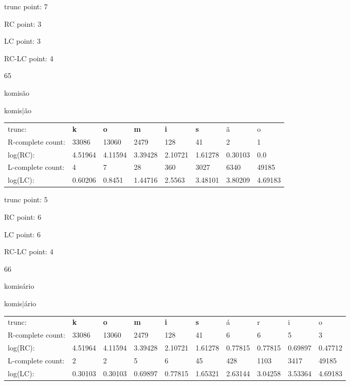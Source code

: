 \documentclass{article}
\begin{document}
trunc point: 7

RC point: 3

LC point: 3

RC-LC point: 4

\vspace{3em}



65

komisão

komis$|$ão

\vspace{1em}

\begin{tabular}{l|lllllll}

trunc: & {\color{red}\bf k} & {\color{red}\bf o} & {\color{red}\bf m} & {\color{red}\bf i} & {\color{red}\bf s} & ã & o \\ 
R-complete count: & 33086 & 13060 & 2479 & 128 & 41 & 2 & 1 \\ 
log(RC): & 4.51964 & 4.11594 & 3.39428 & 2.10721 & 1.61278 & 0.30103 & 0.0 \\ 
L-complete count: & 4 & 7 & 28 & 360 & 3027 & 6340 & 49185 \\ 
log(LC): & 0.60206 & 0.8451 & 1.44716 & 2.5563 & 3.48101 & 3.80209 & 4.69183 \\ 
\end{tabular}

trunc point: 5

RC point: 6

LC point: 6

RC-LC point: 4

\vspace{3em}



66

komisário

komis$|$ário

\vspace{1em}

\begin{tabular}{l|lllllllll}

trunc: & {\color{red}\bf k} & {\color{red}\bf o} & {\color{red}\bf m} & {\color{red}\bf i} & {\color{red}\bf s} & á & r & i & o \\ 
R-complete count: & 33086 & 13060 & 2479 & 128 & 41 & 6 & 6 & 5 & 3 \\ 
log(RC): & 4.51964 & 4.11594 & 3.39428 & 2.10721 & 1.61278 & 0.77815 & 0.77815 & 0.69897 & 0.47712 \\ 
L-complete count: & 2 & 2 & 5 & 6 & 45 & 428 & 1103 & 3417 & 49185 \\ 
log(LC): & 0.30103 & 0.30103 & 0.69897 & 0.77815 & 1.65321 & 2.63144 & 3.04258 & 3.53364 & 4.69183 \\ 
\end{tabular}
\end{document}
